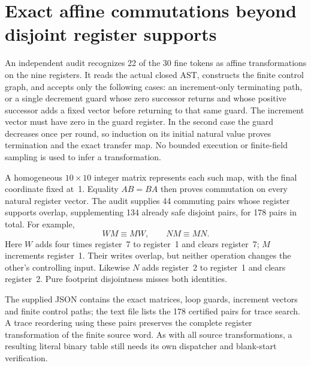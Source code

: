 \section{Exact affine commutations beyond disjoint register supports}

An independent audit recognizes 22 of the 30 fine tokens as affine
transformations on the nine registers.  It reads the actual closed AST,
constructs the finite control graph, and accepts only the following cases:
an increment-only terminating path, or a single decrement guard whose
zero successor returns and whose positive successor adds a fixed vector
before returning to that same guard.  The increment vector must have zero
in the guard register.  In the second case the guard decreases once per
round, so induction on its initial natural value proves termination and the
exact transfer map.  No bounded execution or finite-field sampling is used
to infer a transformation.

A homogeneous $10\times10$ integer matrix represents each such map, with
the final coordinate fixed at~1.  Equality $AB=BA$ then proves commutation
on every natural register vector.  The audit supplies 44 commuting pairs
whose register supports overlap, supplementing 134 already safe disjoint
pairs, for 178 pairs in total.  For example,
\[
 W M\equiv M W,
 \qquad N M\equiv M N.
\]
Here $W$ adds four times register~7 to register~1 and clears register~7;
$M$ increments register~1.  Their writes overlap, but neither operation
changes the other's controlling input.  Likewise $N$ adds register~2 to
register~1 and clears register~2.  Pure footprint disjointness misses both
identities.

The supplied JSON contains the exact matrices, loop guards, increment
vectors and finite control paths; the text file lists the 178 certified
pairs for trace search.  A trace reordering using these pairs preserves
the complete register transformation of the finite source word.  As with
all source transformations, a resulting literal binary table still needs
its own dispatcher and blank-start verification.

